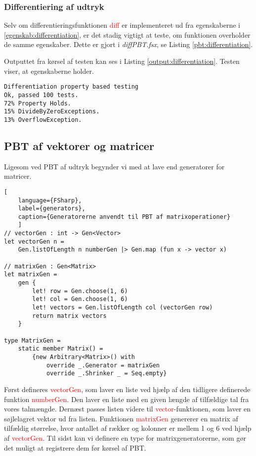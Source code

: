 \subsubsection{Differentiering af udtryk}\label{sec:PBT_differentiation}
Selv om differentieringsfunktionen \textcolor{red}{diff} er implementeret ud fra egenskaberne i \ref{egenskab:differentiation}, er det stadig vigtigt at teste, om funktionen overholder de samme egenskaber. Dette er gjort i \textit{diffPBT.fsx}, se Listing \ref{pbt:differentiation}.



Outputtet fra kørsel af testen kan ses i Listing \ref{output:differentiation}. Testen viser, at egenskaberne holder.

\begin{lstlisting}[style=output, caption={Outputtet fra PBT af differentiering af udtryk}, label={output:differentiation}]
Differentiation property based testing
Ok, passed 100 tests.
72% Property Holds.
15% DivideByZeroExceptions.
13% OverflowException.
\end{lstlisting}



\subsection{PBT af vektorer og matricer}
Ligesom ved PBT af udtryk begynder vi med at lave end generatorer for matricer.

\begin{lstlisting}[
    language={FSharp}, 
    label={generators}, 
    caption={Generatorerne anvendt til PBT af matrixoperationer}
    ]
// vectorGen : int -> Gen<Vector>
let vectorGen n =
    Gen.listOfLength n numberGen |> Gen.map (fun x -> vector x)

// matrixGen : Gen<Matrix>
let matrixGen =
    gen {
        let! row = Gen.choose(1, 6)
        let! col = Gen.choose(1, 6)
        let! vectors = Gen.listOfLength col (vectorGen row)
        return matrix vectors
    }

type MatrixGen =
    static member Matrix() =
        {new Arbitrary<Matrix>() with
            override _.Generator = matrixGen
            override _.Shrinker _ = Seq.empty}
\end{lstlisting}

Først defineres \textcolor{red}{vectorGen}, som laver en liste ved hjælp af den tidligere definerede funktion \textcolor{red}{numberGen}. Den laver en liste med en given længde af tilfældige tal fra vores talmængde. Dernæst passes listen videre til \textcolor{red}{vector}-funktionen, som laver en søjlelagret vektor ud fra listen. Funktionen \textcolor{red}{matrixGen} genererer en matrix af tilfældig størrelse, hvor antallet af rækker og kolonner er mellem 1 og 6 ved hjælp af \textcolor{red}{vectorGen}. Til sidst kan vi definere en type for matrixgeneratorerne, som gør det muligt at registrere dem før kørsel af PBT.

